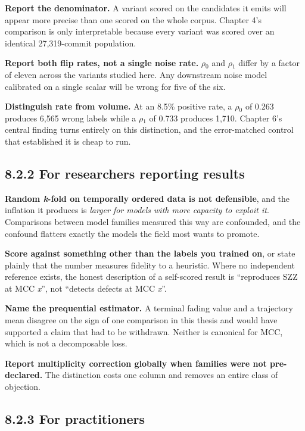 \textbf{Report the denominator.} A variant scored on the candidates it
emits will appear more precise than one scored on the whole corpus.
Chapter 4's comparison is only interpretable because every variant was
scored over an identical 27,319-commit population.

\textbf{Report both flip rates, not a single noise rate.} \ensuremath{\rho}\ensuremath{_0} and \ensuremath{\rho}\ensuremath{_1}
differ by a factor of eleven across the variants studied here. Any
downstream noise model calibrated on a single scalar will be wrong for
five of the six.

\textbf{Distinguish rate from volume.} At an 8.5\% positive rate, a \ensuremath{\rho}\ensuremath{_0}
of 0.263 produces 6,565 wrong labels while a \ensuremath{\rho}\ensuremath{_1} of 0.733 produces 1,710.
Chapter 6's central finding turns entirely on this distinction, and the
error-matched control that established it is cheap to run.

\subsection{8.2.2 For researchers reporting
results}\label{for-researchers-reporting-results}

\textbf{Random \emph{k}-fold on temporally ordered data is not
defensible}, and the inflation it produces is \emph{larger for models
with more capacity to exploit it}. Comparisons between model families
measured this way are confounded, and the confound flatters exactly the
models the field most wants to promote.

\textbf{Score against something other than the labels you trained on},
or state plainly that the number measures fidelity to a heuristic. Where
no independent reference exists, the honest description of a self-scored
result is ``reproduces SZZ at MCC \emph{x}'', not ``detects defects at
MCC \emph{x}''.

\textbf{Name the prequential estimator.} A terminal fading value and a
trajectory mean disagree on the sign of one comparison in this thesis
and would have supported a claim that had to be withdrawn. Neither is
canonical for MCC, which is not a decomposable loss.

\textbf{Report multiplicity correction globally when families were not
pre-declared.} The distinction costs one column and removes an entire
class of objection.

\subsection{8.2.3 For practitioners}\label{for-practitioners}

